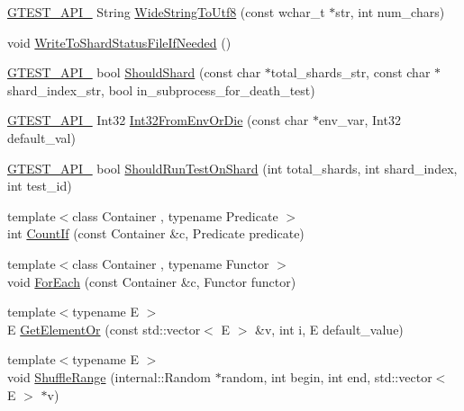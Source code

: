 \begin{DoxyCompactItemize}
\item 
\hyperlink{gtest-port_8h_aa73be6f0ba4a7456180a94904ce17790}{\-G\-T\-E\-S\-T\-\_\-\-A\-P\-I\-\_\-} \-String \hyperlink{namespacetesting_1_1internal_a1a297845a586bbc4f853032571736af2}{\-Wide\-String\-To\-Utf8} (const wchar\-\_\-t $\ast$str, int num\-\_\-chars)
\item 
void \hyperlink{namespacetesting_1_1internal_a656c8ec8f2ee82fa90b9ba61b6145538}{\-Write\-To\-Shard\-Status\-File\-If\-Needed} ()
\item 
\hyperlink{gtest-port_8h_aa73be6f0ba4a7456180a94904ce17790}{\-G\-T\-E\-S\-T\-\_\-\-A\-P\-I\-\_\-} bool \hyperlink{namespacetesting_1_1internal_a57e2697262a419061fc4cd3377a9271e}{\-Should\-Shard} (const char $\ast$total\-\_\-shards\-\_\-str, const char $\ast$shard\-\_\-index\-\_\-str, bool in\-\_\-subprocess\-\_\-for\-\_\-death\-\_\-test)
\item 
\hyperlink{gtest-port_8h_aa73be6f0ba4a7456180a94904ce17790}{\-G\-T\-E\-S\-T\-\_\-\-A\-P\-I\-\_\-} \-Int32 \hyperlink{namespacetesting_1_1internal_afec7cf2eb159fa969f88d192ee507d23}{\-Int32\-From\-Env\-Or\-Die} (const char $\ast$env\-\_\-var, \-Int32 default\-\_\-val)
\item 
\hyperlink{gtest-port_8h_aa73be6f0ba4a7456180a94904ce17790}{\-G\-T\-E\-S\-T\-\_\-\-A\-P\-I\-\_\-} bool \hyperlink{namespacetesting_1_1internal_ac05861de55e638fa73ea70a3f2f6f622}{\-Should\-Run\-Test\-On\-Shard} (int total\-\_\-shards, int shard\-\_\-index, int test\-\_\-id)
\item 
{\footnotesize template$<$class Container , typename Predicate $>$ }\\int \hyperlink{namespacetesting_1_1internal_ab37ae76c997078f65ba28f35b3657151}{\-Count\-If} (const \-Container \&c, \-Predicate predicate)
\item 
{\footnotesize template$<$class Container , typename Functor $>$ }\\void \hyperlink{namespacetesting_1_1internal_af699259a2b1e5e06250ed075b735b1f6}{\-For\-Each} (const \-Container \&c, \-Functor functor)
\item 
{\footnotesize template$<$typename E $>$ }\\\-E \hyperlink{namespacetesting_1_1internal_a06b7c21a279eef9fbf0b8810af41e6b5}{\-Get\-Element\-Or} (const std\-::vector$<$ \-E $>$ \&v, int i, \-E default\-\_\-value)
\item 
{\footnotesize template$<$typename E $>$ }\\void \hyperlink{namespacetesting_1_1internal_af0e4357002b5772a92cb960ea611e80c}{\-Shuffle\-Range} (internal\-::\-Random $\ast$random, int begin, int end, std\-::vector$<$ \-E $>$ $\ast$v)

\end{DoxyCompactItemize}
